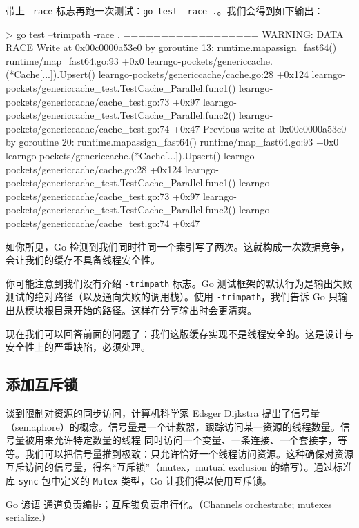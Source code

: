 带上 \texttt{-race} 标志再跑一次测试：\texttt{go test -race .}。我们会得到如下输出：

\begin{shellcode}[]
> go test --trimpath -race .
==================
WARNING: DATA RACE
Write at 0x00c0000a53e0 by goroutine 13:
  runtime.mapassign_fast64()
      runtime/map_fast64.go:93 +0x0
  learngo-pockets/genericcache.(*Cache[...]).Upsert()
      learngo-pockets/genericcache/cache.go:28 +0x124
  learngo-pockets/genericcache_test.TestCache_Parallel.func1()
      learngo-pockets/genericcache/cache_test.go:73 +0x97
  learngo-pockets/genericcache_test.TestCache_Parallel.func2()
      learngo-pockets/genericcache/cache_test.go:74 +0x47
Previous write at 0x00c0000a53e0 by goroutine 20:
  runtime.mapassign_fast64()
      runtime/map_fast64.go:93 +0x0
  learngo-pockets/genericcache.(*Cache[...]).Upsert()
      learngo-pockets/genericcache/cache.go:28 +0x124
  learngo-pockets/genericcache_test.TestCache_Parallel.func1()
      learngo-pockets/genericcache/cache_test.go:73 +0x97
  learngo-pockets/genericcache_test.TestCache_Parallel.func2()
      learngo-pockets/genericcache/cache_test.go:74 +0x47
\end{shellcode}

如你所见，Go 检测到我们同时往同一个索引写了两次。这就构成一次数据竞争，会让我们的缓存不具备线程安全性。

你可能注意到我们没有介绍 \texttt{-\-trimpath} 标志。Go 测试框架的默认行为是输出失败测试的绝对路径（以及通向失败的调用栈）。使用 \texttt{-\-trimpath}，我们告诉 Go 只输出从模块根目录开始的路径。这样在分享输出时会更清爽。

现在我们可以回答前面的问题了：我们这版缓存实现不是线程安全的。这是设计与安全性上的严重缺陷，必须处理。

\subsection{添加互斥锁}

谈到限制对资源的同步访问，计算机科学家 Edsger Dijkstra 提出了信号量（semaphore）的概念。信号量是一个计数器，跟踪访问某一资源的线程数量。信号量被用来允许特定数量的线程
同时访问一个变量、一条连接、一个套接字，等等。我们可以把信号量推到极致：只允许恰好一个线程访问资源。这种确保对资源互斥访问的信号量，得名``互斥锁''（mutex，mutual exclusion 的缩写）。通过标准库 \texttt{sync} 包中定义的 \texttt{Mutex} 类型，Go 让我们得以使用互斥锁。

\begin{tipbox}{Go 谚语}
通道负责编排；互斥锁负责串行化。（Channels orchestrate; mutexes serialize.）
\end{tipbox}

